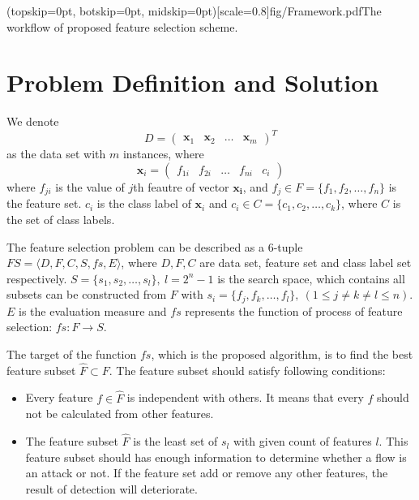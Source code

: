 \documentclass{ieeeaccess}
\theoremstyle{definition}
\begin{document}
\Figure[!htpb](topskip=0pt, botskip=0pt, midskip=0pt)[scale=0.8]{fig/Framework.pdf}{The workflow of proposed feature selection scheme.\label{fig:framework}}

\section{Problem Definition and Solution}
\label{sec:problem}

We denote 
$$D=\left(\begin{array}{llll}
    \bm{x}_1 & \bm{x}_2 & \ldots & \bm{x}_m
\end{array}\right)^T$$
as the data set with $m$ instances, where 
$$\bm{x}_i = \left(\begin{array}{lllll}
    f_{1i} & f_{2i} & \ldots & f_{ni} & c_i
\end{array}\right)$$
where $f_{ji}$ is the value of $j$th feautre of vector $\bm{x_i}$, and $f_j \in F = \{f_1, f_2, \ldots, f_n\}$ is the feature set. $c_i$ is the class label of $\bm{x}_i$ and $c_i \in C = \{c_1, c_2, \ldots, c_k\}$, where $C$ is the set of class labels.

The feature selection problem\cite{Maza2018} can be described as a 6-tuple $FS=\langle D, F, C, S, fs, E \rangle$, where $D, F, C$ are data set, feature set and class label set respectively. $S=\{s_1, s_2, \ldots, s_l\}, \ l=2^n-1$ is the search space, which contains all subsets can be constructed from $F$ with $s_i=\{f_j, f_k, \ldots, f_l\}, \ (1 \leqslant j \neq k \neq l \leqslant n)$. $E$ is the evaluation measure and $fs$ represents the function of process of feature selection: $fs: F \rightarrow S$.

The target of the function $fs$, which is the proposed algorithm, is to find the best feature subset $\hat{F} \subset F$. The feature subset should satisfy following conditions:
\begin{itemize}
    \item Every feature $f \in \hat{F}$ is independent with others. It means that every $f$ should not be calculated from other features.
    \item The feature subset $\hat{F}$ is the least set of $s_l$ with given count of features $l$. This feature subset should has enough information to determine whether a flow is an attack or not. If the feature set add or remove any other features, the result of detection will deteriorate.
\end{itemize}
\end{document}
